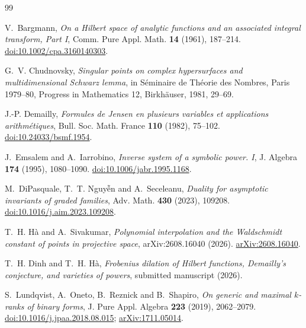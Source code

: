 \documentclass[11pt]{article}
\theoremstyle{remark}
\begin{document}
\small
\begin{thebibliography}{99}

V.~Bargmann,
\emph{On a Hilbert space of analytic functions and an associated integral transform, Part I},
Comm. Pure Appl. Math. \textbf{14} (1961), 187--214.
\href{https://doi.org/10.1002/cpa.3160140303}{doi:10.1002/cpa.3160140303}.

G.~V. Chudnovsky,
\emph{Singular points on complex hypersurfaces and multidimensional Schwarz lemma},
in S\'eminaire de Th\'eorie des Nombres, Paris 1979--80,
Progress in Mathematics 12, Birkh\"auser, 1981, 29--69.

J.-P. Demailly,
\emph{Formules de Jensen en plusieurs variables et applications arithm\'etiques},
Bull. Soc. Math. France \textbf{110} (1982), 75--102.
\href{https://doi.org/10.24033/bsmf.1954}{doi:10.24033/bsmf.1954}.

J.~Emsalem and A.~Iarrobino,
\emph{Inverse system of a symbolic power. I},
J. Algebra \textbf{174} (1995), 1080--1090.
\href{https://doi.org/10.1006/jabr.1995.1168}{doi:10.1006/jabr.1995.1168}.

M.~DiPasquale, T.~T. Nguy\~{\^e}n and A.~Seceleanu,
\emph{Duality for asymptotic invariants of graded families},
Adv. Math. \textbf{430} (2023), 109208.
\href{https://doi.org/10.1016/j.aim.2023.109208}{doi:10.1016/j.aim.2023.109208}.

T.~H. H\`a and A.~Sivakumar,
\emph{Polynomial interpolation and the Waldschmidt constant of points in projective space},
arXiv:2608.16040 (2026).
\href{https://arxiv.org/abs/2608.16040}{arXiv:2608.16040}.

T.~H. Dinh and T.~H. H\`a,
\emph{Frobenius dilation of Hilbert functions, Demailly's conjecture, and varieties of powers},
submitted manuscript (2026).

S.~Lundqvist, A.~Oneto, B.~Reznick and B.~Shapiro,
\emph{On generic and maximal $k$-ranks of binary forms},
J. Pure Appl. Algebra \textbf{223} (2019), 2062--2079.
\href{https://doi.org/10.1016/j.jpaa.2018.08.015}{doi:10.1016/j.jpaa.2018.08.015}; \href{https://arxiv.org/abs/1711.05014}{arXiv:1711.05014}.

\end{thebibliography}
\end{document}
